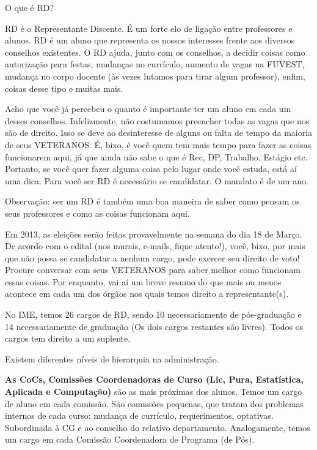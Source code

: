 \begin{secao}{O que é RD?}

RD é o Representante Discente. É um forte elo de ligação entre professores e
alunos. RD é um aluno que representa os nossos interesses frente aos diversos
conselhos existentes. O RD ajuda, junto com os conselhos, a decidir coisas como
autorização para festas, mudanças no currículo, aumento de vagas na FUVEST,
mudança no corpo docente (às vezes lutamos para tirar algum professor), enfim,
coisas desse tipo e muitas mais.

Acho que você já percebeu o quanto é importante ter um aluno em cada um desses
conselhos. Infelizmente, não costumamos preencher todas as vagas que nos são de
direito. Isso se deve ao desinteresse de alguns ou falta de tempo da maioria
de seus VETERANOS. É, bixo, é você quem tem mais tempo para fazer as coisas
funcionarem aqui, já que ainda não sabe o que é Rec, DP, Trabalho, Estágio etc.
Portanto, se você quer fazer alguma coisa pelo lugar onde você estuda, está aí
uma dica. Para você ser RD é necessário se candidatar. O mandato é de um
ano.

Observação: ser um RD é também uma boa maneira de saber como pensam os seus 
professores e como as coisas funcionam aqui.

Em 2013, as eleições serão feitas provavelmente na semana do dia 18 de Março. 
De acordo com o edital (nos murais, e-mails, fique atento!), 
você, bixo, por mais que não possa se candidatar a nenhum cargo, pode exercer
seu direito de voto! Procure conversar com seus VETERANOS para saber melhor
como funcionam essas coisas. Por enquanto, vai aí um breve resumo do que mais
ou menos acontece em cada um dos órgãos nos quais temos direito a
representante(s).

No IME, temos 26 cargos de RD, sendo 10 necessariamente de pós-graduação e 14
necessariamente de graduação (Os dois cargos restantes são livres). Todos os
cargos tem direito a um suplente.

Existem diferentes níveis de hierarquia na administração.

{\bf As CoCs,
Comissões Coordenadoras de Curso (Lic, Pura, Estatística, Aplicada e
Computação)} são as mais próximas dos alunos. Temos um cargo de aluno em cada
comissão. São comissões pequenas, que tratam dos problemas internos de cada
curso: mudança de currículo, requerimentos, optativas. Subordinada à CG e ao
conselho do relativo departamento. Analogamente, temos um cargo em cada
Comissão Coordenadora de Programa (de Pós).


\end{secao}
